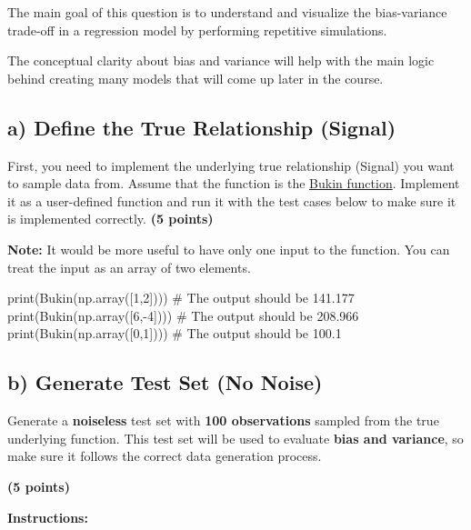 \documentclass[
  letterpaper,
  DIV=11,
  numbers=noendperiod]{scrreprt}
\newenvironment{Shaded}{\begin{snugshade}}{\end{snugshade}}
\newcommand{\BuiltInTok}[1]{\textcolor[rgb]{0.00,0.23,0.31}{#1}}
\newcommand{\CommentTok}[1]{\textcolor[rgb]{0.37,0.37,0.37}{#1}}
\newcommand{\DecValTok}[1]{\textcolor[rgb]{0.68,0.00,0.00}{#1}}
\newcommand{\NormalTok}[1]{\textcolor[rgb]{0.00,0.23,0.31}{#1}}
\newcommand{\OperatorTok}[1]{\textcolor[rgb]{0.37,0.37,0.37}{#1}}
\begin{document}
The main goal of this question is to understand and visualize the
bias-variance trade-off in a regression model by performing repetitive
simulations.

The conceptual clarity about bias and variance will help with the main
logic behind creating many models that will come up later in the course.

\subsection{a) Define the True Relationship
(Signal)}\label{a-define-the-true-relationship-signal}

First, you need to implement the underlying true relationship (Signal)
you want to sample data from. Assume that the function is the
\href{https://www.sfu.ca/~ssurjano/bukin6.html}{Bukin function}.
Implement it as a user-defined function and run it with the test cases
below to make sure it is implemented correctly. \textbf{(5 points)}

\textbf{Note:} It would be more useful to have only one input to the
function. You can treat the input as an array of two elements.

\begin{Shaded}
\begin{Highlighting}[]
\BuiltInTok{print}\NormalTok{(Bukin(np.array([}\DecValTok{1}\NormalTok{,}\DecValTok{2}\NormalTok{]))) }\CommentTok{\# The output should be 141.177}
\BuiltInTok{print}\NormalTok{(Bukin(np.array([}\DecValTok{6}\NormalTok{,}\OperatorTok{{-}}\DecValTok{4}\NormalTok{]))) }\CommentTok{\# The output should be 208.966}
\BuiltInTok{print}\NormalTok{(Bukin(np.array([}\DecValTok{0}\NormalTok{,}\DecValTok{1}\NormalTok{]))) }\CommentTok{\# The output should be 100.1}
\end{Highlighting}
\end{Shaded}

\subsection{b) Generate Test Set (No
Noise)}\label{b-generate-test-set-no-noise}

Generate a \textbf{noiseless} test set with \textbf{100 observations}
sampled from the true underlying function. This test set will be used to
evaluate \textbf{bias and variance}, so make sure it follows the correct
data generation process.

\textbf{(5 points)}

\textbf{Instructions:}
\end{document}
